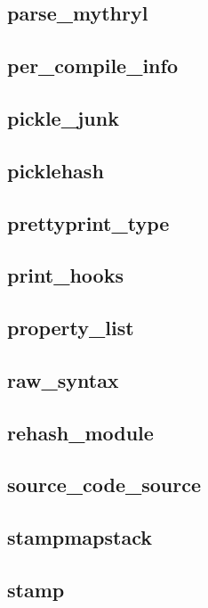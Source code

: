 \subsection{parse\_mythryl}					
\subsection{per\_compile\_info}					
\subsection{pickle\_junk}					
\subsection{picklehash}						
\subsection{prettyprint\_type}					
\subsection{print\_hooks}					
\subsection{property\_list}					
\subsection{raw\_syntax}					
\subsection{rehash\_module}					
\subsection{source\_code\_source}				
\subsection{stampmapstack}					
\subsection{stamp}						
